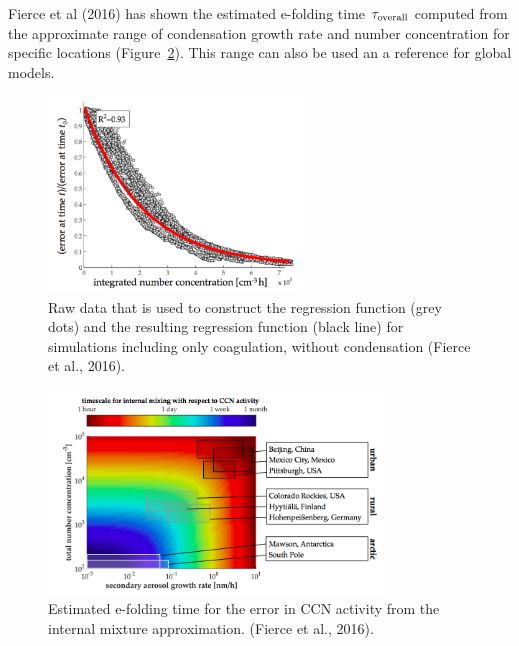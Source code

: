 \documentclass[12pt]{article}
\begin{document}
		Fierce et al (2016) has shown the estimated e-folding time $\tau_{\rm overall}$ computed from the approximate range of condensation growth rate and number concentration for specific locations (Figure~\ref{fig_P7}). This range can also be used an a reference for global models.
		
		\begin{figure}[H] 
			\begin{center}
				\includegraphics[width = 0.6\textwidth]{Figure02}
				\caption[]{\label{fig_P2}Raw data that is used to construct the regression function (grey dots) and the resulting regression function (black line) for simulations including only coagulation, without condensation (Fierce et al., 2016).}
			\end{center}
		\end{figure}
		
		\begin{figure}[H] 
			\begin{center}
				\includegraphics[width = 0.8\textwidth]{Figure07}
				\caption[]{\label{fig_P7}Estimated e-folding time for the error in CCN activity from the internal mixture approximation. (Fierce et al., 2016).}
			\end{center}
		\end{figure}
 
 	\clearpage
 	
\end{document}
